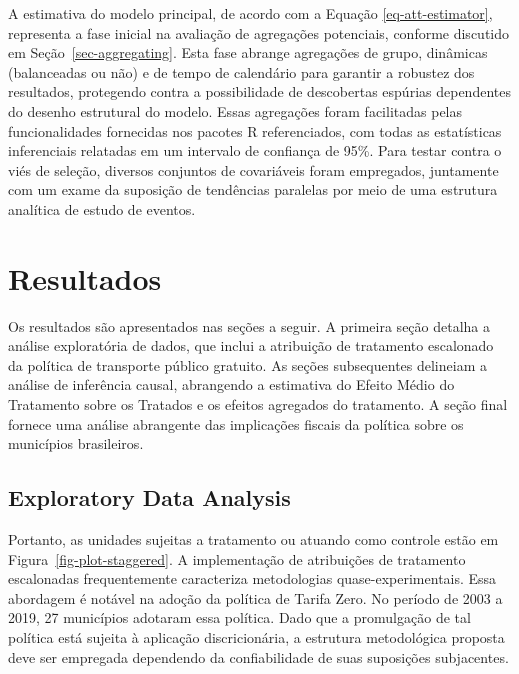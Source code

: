 \documentclass[12pt, a4paper, twoside]{article}
\numberwithin{equation}{subsection} %
\begin{document}
A estimativa do modelo principal, de acordo com a Equação
\eqref{eq-att-estimator}, representa a fase inicial na avaliação de
agregações potenciais, conforme discutido em
Seção~\ref{sec-aggregating}. Esta fase abrange agregações de grupo,
dinâmicas (balanceadas ou não) e de tempo de calendário para garantir a
robustez dos resultados, protegendo contra a possibilidade de
descobertas espúrias dependentes do desenho estrutural do modelo. Essas
agregações foram facilitadas pelas funcionalidades fornecidas nos
pacotes R referenciados, com todas as estatísticas inferenciais
relatadas em um intervalo de confiança de 95\%. Para testar contra o
viés de seleção, diversos conjuntos de covariáveis
\hspace{0pt}\hspace{0pt}foram empregados, juntamente com um exame da
suposição de tendências paralelas por meio de uma estrutura analítica de
estudo de eventos.

\newpage

\hypertarget{sec-results}{%
\section{Resultados}\label{sec-results}}

Os resultados são apresentados nas seções a seguir. A primeira seção
detalha a análise exploratória de dados, que inclui a atribuição de
tratamento escalonado da política de transporte público gratuito. As
seções subsequentes delineiam a análise de inferência causal, abrangendo
a estimativa do Efeito Médio do Tratamento sobre os Tratados e os
efeitos agregados do tratamento. A seção final fornece uma análise
abrangente das implicações fiscais da política sobre os municípios
brasileiros.

\hypertarget{sec-exploratory}{%
\subsection{Exploratory Data Analysis}\label{sec-exploratory}}

Portanto, as unidades sujeitas a tratamento ou atuando como controle
estão em Figura~\ref{fig-plot-staggered}. A implementação de atribuições
de tratamento escalonadas frequentemente caracteriza metodologias
quase-experimentais. Essa abordagem é notável na adoção da política de
Tarifa Zero. No período de 2003 a 2019, 27 municípios adotaram essa
política. Dado que a promulgação de tal política está sujeita à
aplicação discricionária, a estrutura metodológica proposta deve ser
empregada dependendo da confiabilidade de suas suposições subjacentes.
\end{document}

